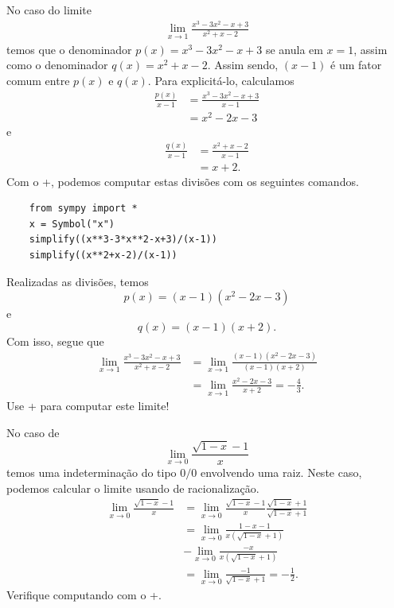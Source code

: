 \begin{ex}
  No caso do limite
  \begin{align}
    \lim_{x\to 1} \frac{x^3-3x^2-x+3}{x^2+x-2}
  \end{align}
  temos que o denominador $p(x) = x^3-3x^2-x+3$ se anula em $x=1$, assim como o denominador $q(x) = x^2+x-2$. Assim sendo, $(x-1)$ é um fator comum entre $p(x)$ e $q(x)$. Para explicitá-lo, calculamos
  \begin{align}
    \frac{p(x)}{x-1} &= \frac{x^3-3x^2-x+3}{x-1}\\
                     &= x^2-2x-3
  \end{align}
  e
  \begin{align}
    \frac{q(x)}{x-1} &= \frac{x^2+x-2}{x-1}\\
                     &= x+2.
  \end{align}
  \ifispython
  Com o {\python}+{\sympy}, podemos computar estas divisões com os seguintes comandos.
  \begin{lstlisting}
    from sympy import *
    x = Symbol("x")
    simplify((x**3-3*x**2-x+3)/(x-1))
    simplify((x**2+x-2)/(x-1))
  \end{lstlisting}
  \fi
  Realizadas as divisões, temos
  \begin{equation}
    p(x) = (x-1)(x^2-2x-3)
  \end{equation}
  e
  \begin{equation}
    q(x)=(x-1)(x+2).
  \end{equation}
  Com isso, segue que
  \begin{align}
    \lim_{x\to 1} \frac{x^3-3x^2-x+3}{x^2+x-2} &= \lim_{x\to 1} \frac{(x-1)(x^2-2x-3)}{(x-1)(x+2)} \\
    &= \lim_{x\to 1} \frac{x^2-2x-3}{x+2} = -\frac{4}{3}.
  \end{align}
  \ifispython
  Use {\python}+{\sympy} para computar este limite!
  \fi
\end{ex}

\begin{ex}
  No caso de
  \begin{equation}
    \lim_{x\to 0} \frac{\sqrt{1-x}-1}{x}
  \end{equation}
  temos uma indeterminação do tipo $0/0$ envolvendo uma raiz. Neste caso, podemos calcular o limite usando de racionalização.
  \begin{align}
    \lim_{x\to 0} \frac{\sqrt{1-x}-1}{x} &= \lim_{x\to 0} \frac{\sqrt{1-x}-1}{x}\frac{\sqrt{1-x}+1}{\sqrt{1-x}+1}\\
                                         &= \lim_{x\to 0} \frac{1-x-1}{x(\sqrt{1-x}+1)} \\
                                         &- \lim_{x\to 0} \frac{-x}{x(\sqrt{1-x}+1)}\\
    &= \lim_{x\to 0} \frac{-1}{\sqrt{1-x}+1} = -\frac{1}{2}.
  \end{align}
  \ifispython
  Verifique computando com o {\python}+{\sympy}. 
  \fi
\end{ex}

